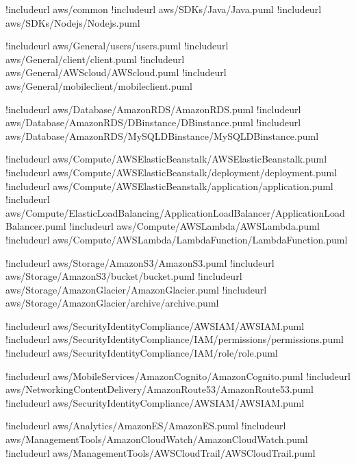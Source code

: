 \documentclass[letterpaper,10pt,english]{sphinxmanual}
\begin{document}
\begin{sphinxVerbatim}[commandchars=\\\{\},numbers=left,firstnumber=1,stepnumber=1]
 
!includeurl \PYGZlt{}aws/common\PYGZgt{}
!includeurl \PYGZlt{}aws/SDKs/Java/Java.puml\PYGZgt{}
!includeurl \PYGZlt{}aws/SDKs/Nodejs/Nodejs.puml\PYGZgt{}

!includeurl \PYGZlt{}aws/General/users/users.puml\PYGZgt{}
!includeurl \PYGZlt{}aws/General/client/client.puml\PYGZgt{}
!includeurl \PYGZlt{}aws/General/AWScloud/AWScloud.puml\PYGZgt{}
!includeurl \PYGZlt{}aws/General/mobileclient/mobileclient.puml\PYGZgt{}

!includeurl \PYGZlt{}aws/Database/AmazonRDS/AmazonRDS.puml\PYGZgt{}
!includeurl \PYGZlt{}aws/Database/AmazonRDS/DBinstance/DBinstance.puml\PYGZgt{}
!includeurl \PYGZlt{}aws/Database/AmazonRDS/MySQLDBinstance/MySQLDBinstance.puml\PYGZgt{}

!includeurl \PYGZlt{}aws/Compute/AWSElasticBeanstalk/AWSElasticBeanstalk.puml\PYGZgt{}
!includeurl \PYGZlt{}aws/Compute/AWSElasticBeanstalk/deployment/deployment.puml\PYGZgt{}
!includeurl \PYGZlt{}aws/Compute/AWSElasticBeanstalk/application/application.puml\PYGZgt{}
!includeurl \PYGZlt{}aws/Compute/ElasticLoadBalancing/ApplicationLoadBalancer/ApplicationLoadBalancer.puml\PYGZgt{}
!includeurl \PYGZlt{}aws/Compute/AWSLambda/AWSLambda.puml\PYGZgt{}
!includeurl \PYGZlt{}aws/Compute/AWSLambda/LambdaFunction/LambdaFunction.puml\PYGZgt{}

!includeurl \PYGZlt{}aws/Storage/AmazonS3/AmazonS3.puml\PYGZgt{}
!includeurl \PYGZlt{}aws/Storage/AmazonS3/bucket/bucket.puml\PYGZgt{}
!includeurl \PYGZlt{}aws/Storage/AmazonGlacier/AmazonGlacier.puml\PYGZgt{}
!includeurl \PYGZlt{}aws/Storage/AmazonGlacier/archive/archive.puml\PYGZgt{}

!includeurl \PYGZlt{}aws/SecurityIdentityCompliance/AWSIAM/AWSIAM.puml\PYGZgt{}
!includeurl \PYGZlt{}aws/SecurityIdentityCompliance/IAM/permissions/permissions.puml\PYGZgt{}
!includeurl \PYGZlt{}aws/SecurityIdentityCompliance/IAM/role/role.puml\PYGZgt{}

!includeurl \PYGZlt{}aws/MobileServices/AmazonCognito/AmazonCognito.puml\PYGZgt{}
!includeurl \PYGZlt{}aws/NetworkingContentDelivery/AmazonRoute53/AmazonRoute53.puml\PYGZgt{}
!includeurl \PYGZlt{}aws/SecurityIdentityCompliance/AWSIAM/AWSIAM.puml\PYGZgt{}

!includeurl \PYGZlt{}aws/Analytics/AmazonES/AmazonES.puml\PYGZgt{}
!includeurl \PYGZlt{}aws/ManagementTools/AmazonCloudWatch/AmazonCloudWatch.puml\PYGZgt{}
!includeurl \PYGZlt{}aws/ManagementTools/AWSCloudTrail/AWSCloudTrail.puml\PYGZgt{}


\end{sphinxVerbatim}
\end{document}

